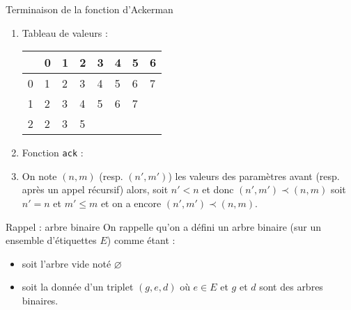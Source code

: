 \documentclass[10pt]{beamer}
\begin{document}
\begin{frame}[fragile]{\Ctitle}{\stitle}
	\begin{exampleblock}{Terminaison de la fonction d'Ackerman}
		\begin{enumerate}
			\item<2-> Tableau de valeurs :\\
				\begin{tabular}{|l|l|l|l|l|l|l|l|}
					\hline
					\backslashbox{$n$}{$m$} & 0     & 1     & 2     & 3        & 4        & 5        & 6        \\
					\hline
					0                       & 1 & 2 & 3 & 4    & 5    & 6    & 7    \\
					\hline
					1                       & 2 & 3 & 4 & 5    & 6    & 7    & \multicolumn{1}{c}{} \\
					\cline{1-7}
					2                       & 2 & 3 & 5 & \multicolumn{4}{c}{} \\
					\cline{1-4}
				\end{tabular}
			\item<3-> Fonction {\tt ack} :
			\item<4-> On note $(n,m)$ (resp. $(n',m')$) les valeurs des paramètres avant (resp. après un appel récursif) alors, soit $n' <n$ et donc $(n',m') \prec (n,m)$ soit $n'=n$ et $m' \leq m$ et on a encore $(n',m') \prec (n,m)$.
		\end{enumerate}
	\end{exampleblock}
\end{frame}

\begin{frame}[fragile]{\Ctitle}{\stitle}
    \begin{block}{Rappel : arbre binaire}
        On rappelle qu'on a défini un arbre binaire (sur un ensemble d'étiquettes $E$) comme étant :
        \begin{itemize}
            \item soit l'arbre vide noté $\varnothing$
            \item soit la donnée d'un triplet $(g, e, d)$ où $e \in E$ et $g$ et $d$ sont des arbres binaires.
        \end{itemize}
    \end{block}
\end{frame}
\end{document}
